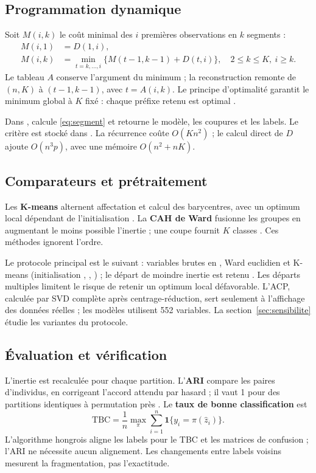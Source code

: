 \subsection{Programmation dynamique}
Soit $M(i,k)$ le coût minimal des $i$ premières observations en $k$ segments :
\begin{align}
 M(i,1)&=D(1,i),\label{eq:base}\\
 M(i,k)&=\min_{t=k,\dots,i}\bigl\{M(t-1,k-1)+D(t,i)\bigr\},
 \quad 2\leq k\leq K,\ i\geq k.\label{eq:recurrence}
\end{align}
Le tableau $A$ conserve l'argument du minimum ; la reconstruction remonte de
$(n,K)$ à $(t-1,k-1)$, avec $t=A(i,k)$. Le principe d'optimalité garantit
le minimum global à $K$ fixé : chaque préfixe retenu est optimal \cite{fisher}.

Dans ,  calcule \eqref{eq:segment} et
 retourne le modèle, les coupures et les labels.
Le critère est stocké dans . La récurrence coûte $O(Kn^2)$ ; le calcul
direct de $D$ ajoute $O(n^3p)$, avec une mémoire $O(n^2+nK)$.

\subsection{Comparateurs et prétraitement}
Les \textbf{K-means} alternent affectation et calcul des barycentres, avec un
optimum local dépendant de l'initialisation \cite{lloyd}.
La \textbf{CAH de Ward} fusionne les groupes en augmentant le moins possible
l'inertie ; une coupe fournit $K$ classes \cite{ward}.
Ces méthodes ignorent l'ordre.

Le protocole principal est le suivant : variables brutes en ,
Ward euclidien et K-means (initialisation , ,
) ; le départ de moindre inertie est retenu \cite{sklearn}.
Les départs multiples limitent le risque de retenir un optimum local défavorable.
L'ACP, calculée par SVD complète après centrage-réduction, sert seulement à
l'affichage des données réelles ; les modèles utilisent
552 variables. La section~\ref{sec:sensibilite} étudie les variantes du protocole.

\subsection{Évaluation et vérification}
L'inertie est recalculée pour chaque partition. L'\textbf{ARI} compare les paires
d'individus, en corrigeant l'accord attendu par hasard ; il vaut 1 pour des
partitions identiques à permutation près \cite{hubert}. Le \textbf{taux de bonne classification}
est \cite{same}
\begin{equation}
 \mathrm{TBC}=\frac{1}{n}\max_{\pi}\sum_{i=1}^{n}
 \mathbf{1}\{y_i=\pi(\widehat z_i)\}.
 \label{eq:tbc}
\end{equation}
L'algorithme hongrois aligne les labels pour le TBC et les matrices de confusion ;
l'ARI ne nécessite aucun alignement. Les changements entre labels voisins
mesurent la fragmentation, pas l'exactitude.

